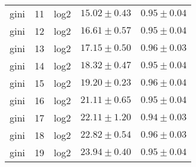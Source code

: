 \begin{tabular}{cccrr}
gini & 11 & log2 & $15.02 \pm 0.43$ & $0.95 \pm 0.04$\\
gini & 12 & log2 & $16.61 \pm 0.57$ & $0.95 \pm 0.04$\\
gini & 13 & log2 & $17.15 \pm 0.50$ & $0.96 \pm 0.03$\\
gini & 14 & log2 & $18.32 \pm 0.47$ & $0.95 \pm 0.04$\\
gini & 15 & log2 & $19.20 \pm 0.23$ & $0.96 \pm 0.04$\\
gini & 16 & log2 & $21.11 \pm 0.65$ & $0.95 \pm 0.04$\\
gini & 17 & log2 & $22.11 \pm 1.20$ & $0.94 \pm 0.03$\\
gini & 18 & log2 & $22.82 \pm 0.54$ & $0.96 \pm 0.03$\\
gini & 19 & log2 & $23.94 \pm 0.40$ & $0.95 \pm 0.04$\\
\bottomrule
\end{tabular}
